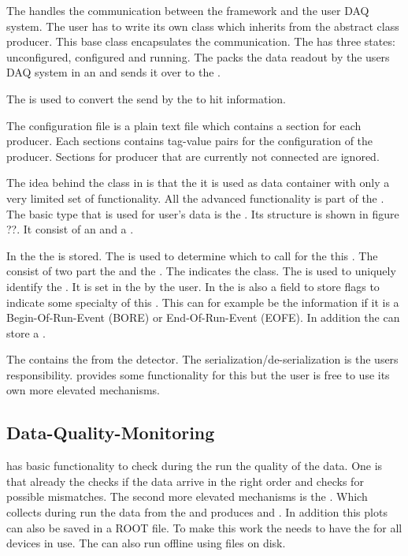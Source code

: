 The \producer handles the communication between the \eudaq framework and the user DAQ system. 
The user has to write its own \producer class which inherits from the abstract class producer. 
This base class encapsulates the \tcp communication. The \producer has three states: unconfigured, configured and running. The \producer packs the data readout by the users DAQ system in an \eudaq \event and sends it over \tcp to the \dc. 

The \dataconverterplugin is used to convert the \rawdata send by the \producer to hit information. 


The configuration file is a plain text file which contains a section for each producer. 
Each sections contains tag-value pairs for the configuration of the producer. 
Sections for producer that are currently not connected are ignored. 

 The idea behind the \event class in \eudaq is that the it is used as data container with only a very limited set of functionality. All the advanced functionality is part of the \dataconverterplugin. The basic \event type that is used for user's data is the \rawdataevent. Its structure is shown in figure ??. It consist of an \eventheader and a \datablock. 

In the \eventheader the \eventtype is stored. The \eventtype is used to determine which \dataconverterplugin to call for the this \event. The \eventype consist of two part the \eventid and the \subeventtype. The \eventid indicates the \cpp class. The \subeventtype is used to uniquely identify the \event. It is set in the \producer by the user. In the \eventheader is also a field to store flags to indicate some specialty of this \event. This can for example be the information if it is a Begin-Of-Run-Event (BORE) or End-Of-Run-Event (EOFE). In addition the \eventheader can store a \timestamp. 
 
The \datablock contains the \rawdata from the detector. The serialization/de-serialization is the users responsibility. \eudaq provides some functionality for this but the user is free to use its own more elevated mechanisms. 
 

\subsection{Data-Quality-Monitoring}

\eudaq has basic functionality to check during the run the quality of the data. One is that already the \dc checks if the data arrive in the right order and checks for possible mismatches. The second more elevated mechanisms is the \onlinemon. Which collects during run the data from the \dc and produces \hitmaps and \corrplots. In addition this  plots can also be saved in a ROOT file. To make this work the \onlinemon needs to have the \dataconverterplugin for all devices in use. The \onlinemon can also run offline using files on disk.


